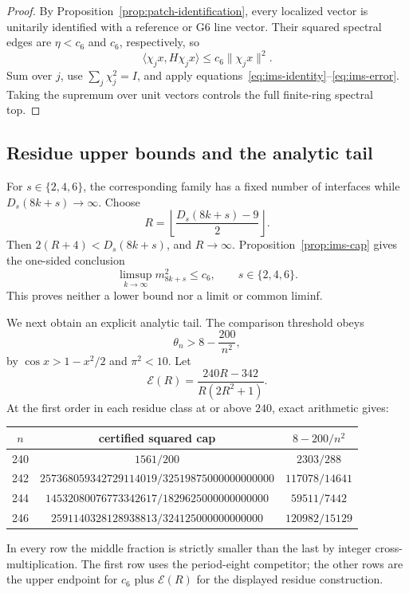 \begin{proof}
By Proposition~\ref{prop:patch-identification}, every localized vector is
unitarily identified with a reference or G6 line vector.  Their squared
spectral edges are \(\eta<c_6\) and \(c_6\), respectively, so
\[
\langle\chi_jx,H\chi_jx\rangle
\leq c_6\|\chi_jx\|^2.
\]
Sum over \(j\), use \(\sum_j\chi_j^2=I\), and apply
equations~\eqref{eq:ims-identity}--\eqref{eq:ims-error}.  Taking the
supremum over unit vectors controls the full finite-ring spectral top.
\end{proof}

\subsection{Residue upper bounds and the analytic tail}
\label{subsec:residue-upper-bounds}

For \(s\in\{2,4,6\}\), the corresponding family has a fixed number of
interfaces while \(D_s(8k+s)\to\infty\).  Choose
\[
R=\left\lfloor\frac{D_s(8k+s)-9}{2}\right\rfloor.
\]
Then \(2(R+4)<D_s(8k+s)\), and \(R\to\infty\).
Proposition~\ref{prop:ims-cap} gives the one-sided conclusion
\begin{equation}\label{eq:residue-limsup}
\limsup_{k\to\infty}m_{8k+s}^2\leq c_6,
\qquad s\in\{2,4,6\}.
\end{equation}
This proves neither a lower bound nor a limit or common liminf.

We next obtain an explicit analytic tail.  The comparison threshold obeys
\[
\theta_n>8-\frac{200}{n^2},
\]
by \(\cos x>1-x^2/2\) and \(\pi^2<10\).  Let
\[
\mathcal E(R)=\frac{240R-342}{R(2R^2+1)}.
\]
At the first order in each residue class at or above \(240\), exact
arithmetic gives:
\begin{center}
\begin{tabular}{c@{\quad}c@{\quad}c}
\toprule
\(n\)&certified squared cap&\(8-200/n^2\)\\
\midrule
240&\(1561/200\)&\(2303/288\)\\
242&\(257368059342729114019/32519875000000000000\)&\(117078/14641\)\\
244&\(14532080076773342617/1829625000000000000\)&\(59511/7442\)\\
246&\(2591140328128938813/324125000000000000\)&\(120982/15129\)\\
\bottomrule
\end{tabular}
\end{center}
In every row the middle fraction is strictly smaller than the last by
integer cross-multiplication.  The first row uses the period-eight
competitor; the other rows are the upper endpoint for \(c_6\) plus
\(\mathcal E(R)\) for the displayed residue construction.

